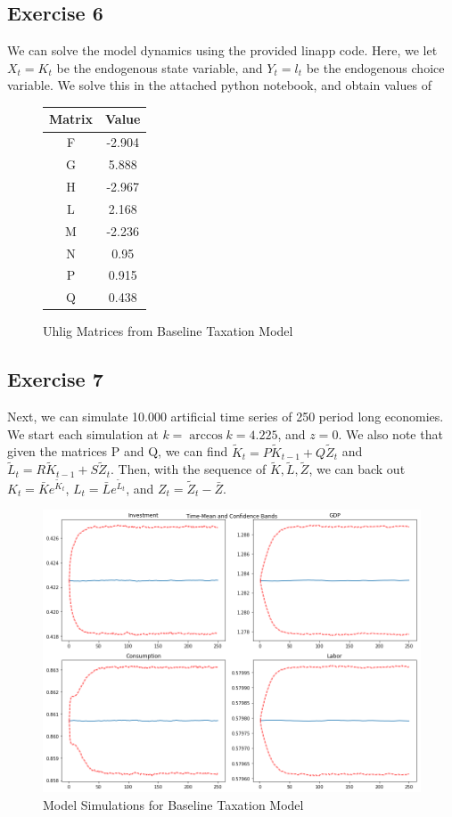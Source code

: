 \documentclass{article}
\begin{document}
    \subsection*{Exercise 6}
    We can solve the model dynamics using the provided linapp code. Here, we let $X_t = K_{t}$ be the endogenous state variable, and $Y_t = l_t$ be the endogenous choice variable. We solve this in the attached python notebook, and obtain values of 
    \begin{figure}[!h]
    	\centering
    	\caption{Uhlig Matrices from Baseline Taxation Model}
    	\begin{tabular}{c | c}
    		Matrix & Value \\
    		\hline
    		F & -2.904 \\
    		G & 5.888 \\
    		H & -2.967 \\
    		L & 2.168 \\
    		M & -2.236 \\
    		N & 0.95 \\
    		P & 0.915 \\
    		Q & 0.438 \\
    		\hline
    	\end{tabular}
    \end{figure}
    
    \newpage
    \subsection*{Exercise 7}
    Next, we can simulate 10.000 artificial time series of 250 period long economies. We start each simulation at $k = \arccos{k} = 4.225$, and $z = 0$. We also note that given the matrices P and Q, we can find $\tilde{K}_t = P \tilde{K}_{t-1} + Q \tilde{Z}_{t}$ and $\tilde{L}_t = R \tilde{K}_{t-1} + S \tilde{Z}_t$. Then, with the sequence of $\tilde{K}, \tilde{L}, \tilde{Z}$, we can back out $K_t = \bar{K} e^{\tilde{K}_t}$, $L_t = \bar{L} e^{\tilde{L}_t}$, and $Z_t = \tilde{Z}_t - \bar{Z}$. 
    
    \begin{figure}[!h]
    	\centering
    	\caption{Model Simulations for Baseline Taxation Model}
    	\includegraphics[scale = 0.5]{fig5}
    \end{figure}
    
\end{document}
